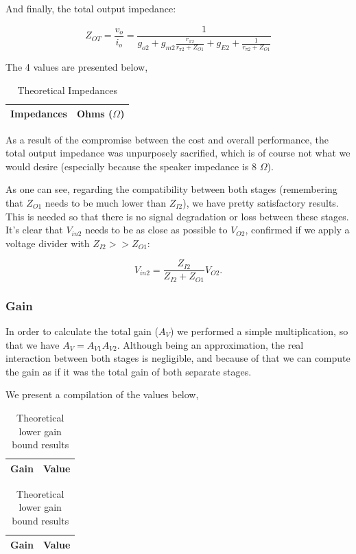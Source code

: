 And finally, the total output impedance:

\begin{equation}
    Z_{OT}=\frac{v_o}{i_o}=\frac{1}{g_{o2}+g_{m2}\frac{r_{\pi2}}{r_{\pi2}+Z_{O1}}+g_{E2}+\frac{1}{r_{\pi2}+Z_{O1}}}
\end{equation}

The 4 values are presented below,

\begin{table}[h]
    \centering
    \begin{tabular}{|l|c|}
    \hline
    {\bf Impedances} & {\bf Ohms ($\Omega$)} \\ \hline
    
    \end{tabular}
    \caption{Theoretical Impedances}
    \label{tab:theo_imp}
\end{table}

As a result of the compromise between the cost and overall performance, the total output impedance was unpurposely sacrified, which is of course not what we would desire (especially because the speaker impedance is 8 $\Omega$). 

As one can see, regarding the compatibility between both stages (remembering that $Z_{O1}$ needs to be  much lower than $Z_{I2}$), we have pretty satisfactory results. This is needed so that there is no signal degradation or loss between these stages. It's clear that $V_{in2}$ needs to be as close as possible to $V_{O2}$, confirmed if we apply a voltage divider with $Z_{I2}>>Z_{O1}$:

\begin{equation}
    V_{in2} = \frac{Z_{I2}}{Z_{I2}+Z_{O1}} V_{O2}. 
\end{equation}

\subsubsection{Gain}

In order to calculate the total gain ($A_{V}$) we performed a simple multiplication, so that we have $A_V=A_{V1}A_{V2}$. Although being an approximation, the real interaction between both stages is negligible, and because of that we can compute the gain as if it was the total gain of both separate stages.

We present a compilation of the values below,


\begin{table}[h]
\parbox{.4\linewidth}{
  \centering
    \begin{tabular}{|l|c|}
    \hline
    {\bf Gain} & {\bf Value} \\ \hline
    
    \end{tabular}
    \caption{Theoretical upper gain bound results}
    \label{tab:theo_gains_high}
  }
  \hfill
  \parbox{.4\textwidth}{
  \centering  
  \begin{tabular}{|c|c|}
    \hline    
    {\bf Gain} & {\bf Value} \\ \hline
    
  \end{tabular}
  \caption{Theoretical lower gain bound results}
  \label{tab:theo_gains_low}
  }
  \end{table}
  
